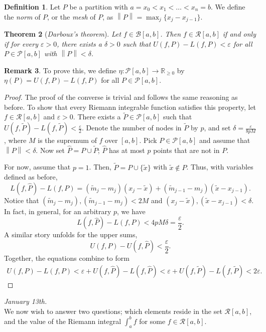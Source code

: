 \documentclass[15pt,a4paper]{book}
\newtheorem{theorem}{Theorem}[chapter]
\theoremstyle{definition}
\newtheorem{definition}[theorem]{Definition}
\newtheorem{remark}[theorem]{Remark}
\newcommand{\eax}[1]{\emph{#1}\index{#1}} %
\newcommand{\R}{\mathbb{R}} %
\newcommand{\cP}{\mathcal{P}}
\newcommand{\cR}{\mathcal{R}}
\newcommand{\cB}{\mathcal{B}}
\newcommand{\norm}[1]{\left\lVert#1\right\rVert}
\begin{document}
\begin{definition}
    Let $P$ be a partition with $a=x_{0} < x_{1} < \ldots < x_{n} = b$. We define the \eax{norm} of $P$, or the \eax{mesh} of $P$, as $\norm{P} = \max_{j}\{x_{j}-x_{j-1}\}$.
\end{definition}

\begin{theorem}[\eax{Darboux's theorem}]
    Let $f \in \cB [a,b]$. Then $f \in \cR [a,b]$ if and only if for every $\varepsilon > 0$, there exists a $\delta > 0$ such that $U(f,P)-L(f,P) < \varepsilon$ for all $P \in \cP [a,b]$ with $\norm{P} < \delta$. 
\end{theorem}
\begin{remark}
    To prove this, we define $\eta: \cP [a,b] \to \R_{\geq 0}$ by $\eta(P) = U(f,P) - L(f,P)$ for all $P \in \cP [a,b]$.
\end{remark}
\begin{proof}
    The proof of the converse is trivial and follows the same reasoning as before. To show that every Riemann integrable function satisfies this property, let $f \in \cR [a,b]$ and $\varepsilon > 0$. There exists a $\tilde{P} \in \cP [a,b]$ such that $U(f,\tilde{P}) - L(f,\tilde{P}) < \frac{\varepsilon}{2}$. Denote the number of nodes in $\tilde{P}$ by $p$, and set $\delta = \frac{\varepsilon}{8pM}$, where $M$ is the supremum of $f$ over $[a,b]$. Pick $P \in \cP [a,b]$ and assume that $\norm{P} < \delta$. Now set $\hat{P} = P \cup \tilde{P}$; $\hat{P}$ has at most $p$ points that are not in $P$.

    For now, assume that $p = 1$. Then, $\tilde{P} = P \cup \{\tilde{x}\}$ with $\tilde{x} \notin P$. Thus, with variables defined as before,
    \begin{equation}
        L(f,\hat{P}) - L(f,P) = (\tilde{m}_{j}-m_{j})(x_{j}-\tilde{x}) + (\tilde{m}_{j-1} - m_{j})(\tilde{x}-x_{j-1}).
    \end{equation}
    Notice that $(\tilde{m}_{j}-m_{j}), (\tilde{m}_{j-1} - m_{j}) < 2M$ and $(x_{j}-\tilde{x}), (\tilde{x}-x_{j-1}) < \delta$. In fact, in general, for an arbitrary $p$, we have
    \begin{equation}
        L(f,\hat{P}) - L(f,P) < 4pM\delta = \frac{\varepsilon}{2}.
    \end{equation}
    A similar story unfolds for the upper sums,
    \begin{equation}
        U(f,P) - U(f, \hat{P}) < \frac{\varepsilon}{2}.
    \end{equation}
    Together, the equations combine to form
    \begin{align}
        U(f,P) - L(f,P) < \varepsilon + U(f,\hat{P})-L(f,\hat{P}) < \varepsilon + U(f,\tilde{P})-L(f,\tilde{P}) < 2\varepsilon.
    \end{align}
\end{proof}
\textit{January 13th.}\\
We now wish to answer two questions; which elements reside in the set $\cR[a,b]$, and the value of the Riemann integral $\int_{a}^{b} f$ for some $f \in \cR[a,b]$.
\end{document}

